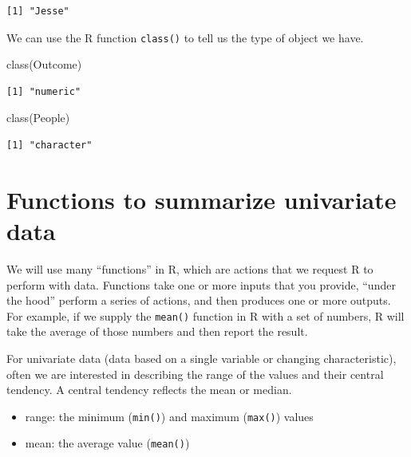 \documentclass[
  letterpaper,
  DIV=11,
  numbers=noendperiod]{scrreprt}
\newenvironment{Shaded}{\begin{snugshade}}{\end{snugshade}}
\newcommand{\FunctionTok}[1]{\textcolor[rgb]{0.28,0.35,0.67}{#1}}
\newcommand{\NormalTok}[1]{\textcolor[rgb]{0.00,0.23,0.31}{#1}}
\providecommand{\tightlist}{%
  \setlength{\itemsep}{0pt}\setlength{\parskip}{0pt}}\usepackage{longtable,booktabs,array}
\begin{document}
\begin{verbatim}
[1] "Jesse"
\end{verbatim}

We can use the R function \texttt{class()} to tell us the type of object
we have.

\begin{Shaded}
\begin{Highlighting}[]
\FunctionTok{class}\NormalTok{(Outcome)}
\end{Highlighting}
\end{Shaded}

\begin{verbatim}
[1] "numeric"
\end{verbatim}

\begin{Shaded}
\begin{Highlighting}[]
\FunctionTok{class}\NormalTok{(People)}
\end{Highlighting}
\end{Shaded}

\begin{verbatim}
[1] "character"
\end{verbatim}

\hypertarget{functions-to-summarize-univariate-data}{%
\section{Functions to summarize univariate
data}\label{functions-to-summarize-univariate-data}}

We will use many ``functions'' in R, which are actions that we request R
to perform with data. Functions take one or more inputs that you
provide, ``under the hood'' perform a series of actions, and then
produces one or more outputs. For example, if we supply the
\texttt{mean()} function in R with a set of numbers, R will take the
average of those numbers and then report the result.

For univariate data (data based on a single variable or changing
characteristic), often we are interested in describing the range of the
values and their central tendency. A central tendency reflects the mean
or median.

\begin{itemize}
\tightlist
\item
  range: the minimum (\texttt{min()}) and maximum (\texttt{max()})
  values
\item
  mean: the average value (\texttt{mean()})
\end{itemize}
\end{document}
